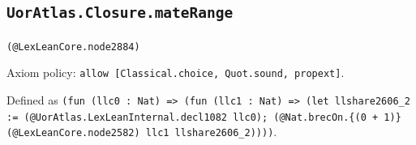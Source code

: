 \documentclass[11pt]{article}
\begin{document}
\subsection*{\texttt{UorAtlas.Closure.mateRange}}
\noindent\texttt{(@LexLeanCore.node2884)}\par
\noindent Axiom policy: \texttt{allow [Classical.choice, Quot.sound, propext]}.\par
\noindent Defined as \texttt{(fun (llc0 : Nat) => (fun (llc1 : Nat) => (let llshare2606\_2 := (@UorAtlas.LexLeanInternal.decl1082 llc0); (@Nat.brecOn.\{(0 + 1)\} (@LexLeanCore.node2582) llc1 llshare2606\_2))))}.\par
\end{document}
